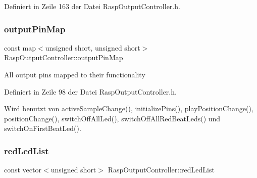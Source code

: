 Definiert in Zeile 163 der Datei Rasp\+Output\+Controller.\+h.

\mbox{\label{class_rasp_output_controller_afd8a9fff94ee9bcf63bcbe6fa810aa32}} 
\subsubsection{\texorpdfstring{output\+Pin\+Map}{outputPinMap}}
{\footnotesize\ttfamily const map$<$unsigned short, unsigned short$>$ Rasp\+Output\+Controller\+::output\+Pin\+Map\hspace{0.3cm}{\ttfamily [private]}}

All output pins mapped to their functionality 

Definiert in Zeile 98 der Datei Rasp\+Output\+Controller.\+h.



Wird benutzt von active\+Sample\+Change(), initialize\+Pins(), play\+Position\+Change(), position\+Change(), switch\+Off\+All\+Led(), switch\+Off\+All\+Red\+Beat\+Leds() und switch\+On\+First\+Beat\+Led().

\mbox{\label{class_rasp_output_controller_a8ee2d3ff908d1094cc9d1320133d0bdf}} 
\subsubsection{\texorpdfstring{red\+Led\+List}{redLedList}}
{\footnotesize\ttfamily const vector$<$unsigned short$>$ Rasp\+Output\+Controller\+::red\+Led\+List\hspace{0.3cm}{\ttfamily [private]}}

